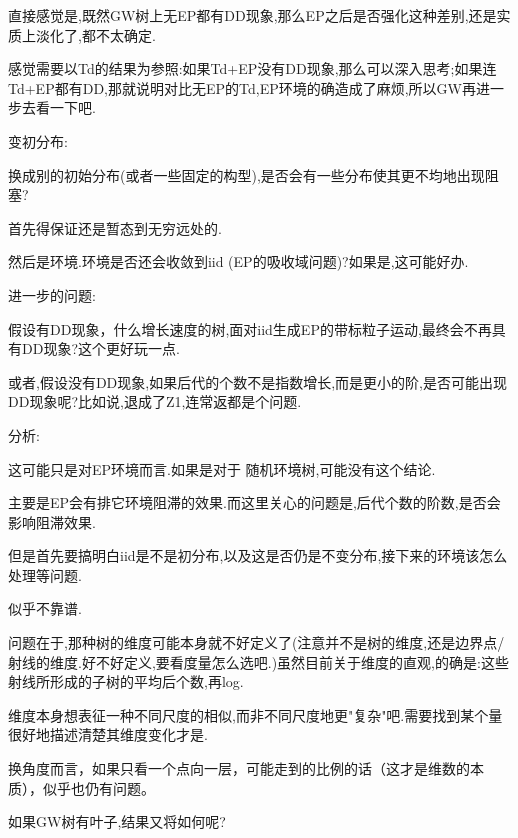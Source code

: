 						直接感觉是,既然GW树上无EP都有DD现象,那么EP之后是否强化这种差别,还是实质上淡化了,都不太确定.

						感觉需要以Td的结果为参照:如果Td+EP没有DD现象,那么可以深入思考;如果连Td+EP都有DD,那就说明对比无EP的Td,EP环境的确造成了麻烦,所以GW再进一步去看一下吧.

				变初分布:

					\begin{que}

						换成别的初始分布(或者一些固定的构型),是否会有一些分布使其更不均地出现阻塞?
					
					\end{que}

					首先得保证还是暂态到无穷远处的.

					然后是环境.环境是否还会收敛到iid (EP的吸收域问题)?如果是,这可能好办.


				进一步的问题:

					\begin{que}[更多或更少的后代是否抵消或产生DD现象]

						假设有DD现象，什么增长速度的树,面对iid生成EP的带标粒子运动,最终会不再具有DD现象?这个更好玩一点.

						或者,假设没有DD现象,如果后代的个数不是指数增长,而是更小的阶,是否可能出现DD现象呢?比如说,退成了Z1,连常返都是个问题.
					
					\end{que}

					分析:

						这可能只是对EP环境而言.如果是对于 随机环境树,可能没有这个结论.

							主要是EP会有排它环境阻滞的效果.而这里关心的问题是,后代个数的阶数,是否会影响阻滞效果.

							但是首先要搞明白iid是不是初分布,以及这是否仍是不变分布,接下来的环境该怎么处理等问题.

						似乎不靠谱.

							问题在于,那种树的维度可能本身就不好定义了(注意并不是树的维度,还是边界点/射线的维度.好不好定义,要看度量怎么选吧.)虽然目前关于维度的直观,的确是:这些射线所形成的子树的平均后个数,再log.

							维度本身想表征一种不同尺度的相似,而非不同尺度地更"复杂"吧.需要找到某个量很好地描述清楚其维度变化才是.

						换角度而言，如果只看一个点向一层，可能走到的比例的话（这才是维数的本质），似乎也仍有问题。

					\begin{que}

						如果GW树有叶子,结果又将如何呢?
					
					\end{que}

